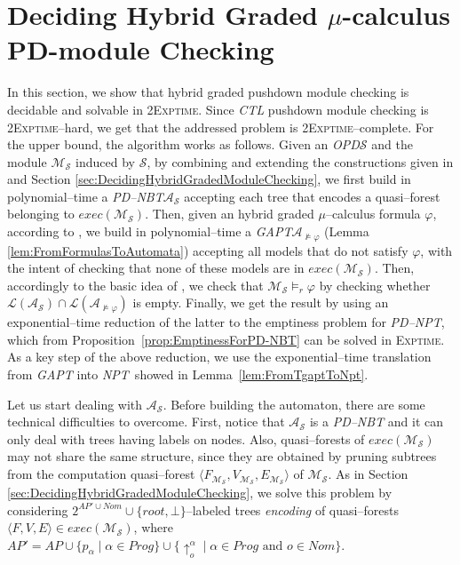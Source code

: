 \documentclass{LMCS}
\theoremstyle{plain}
\def \A             {\mathcal{A}}
\def \CTL           {\emph{CTL}\xspace}
\def \edge          {E}
\def \EXPTIME       {\textsc{Exptime}\xspace}
\def \GAPT          {\emph{GAPT}\xspace}
\def \L             {\mathcal{L}}
\def \M             {\mathcal{M}}
\def \node          {V}
\def \NPT           {\emph{NPT}\xspace}
\def \OPD           {\emph{OPD}\xspace}
\def \PDNBT         {\emph{PD--NBT}\xspace}
\def \PDNPT         {\emph{PD--NPT}\xspace}
\def \rr            {\mathit{root}}
\def \S             {\mathcal{S}}
\def \TWOEXPTIME    {\textsc{2Exptime}\xspace}
\newcommand \tpl[1] {\langle #1 \rangle}
\begin{document}
\section{Deciding Hybrid Graded $\mu$-calculus PD-module Checking}\label{sec:DecidingHybridGradedPushdownModuleChecking}
In this section, we show that hybrid graded pushdown module checking is
decidable and solvable in \TWOEXPTIME. Since \CTL pushdown module checking is
\TWOEXPTIME--hard, we get that the addressed problem is \TWOEXPTIME--complete.
For the upper bound, the algorithm works as follows. Given an \OPD $\S$ and the
module $\M_{\S}$ induced by $\S$, by combining and extending the constructions
given in \cite{BMP05} and Section \ref{sec:DecidingHybridGradedModuleChecking},
we first build in polynomial--time a \PDNBT $\A_{\S}$ accepting each tree that
encodes a quasi--forest belonging to $exec(\M_{\S})$. Then, given an hybrid
graded $\mu$--calculus formula $\varphi$, according to \cite{BLMV06}, we build
in polynomial--time a \GAPT $\A_{\not\models\varphi}$ (Lemma
\ref{lem:FromFormulasToAutomata}) accepting all models that do not satisfy
$\varphi$, with the intent of checking that none of these models are in
$exec(\M_{\S})$. Then, accordingly to the basic idea of \cite{KVW01}, we check
that $\M_{\S} \models_r \varphi$ by checking whether $\L(\A_{\S}) \cap
\L(\A_{\not\models\varphi})$ is empty. Finally, we get the result by using an
exponential--time reduction of the latter to the emptiness problem for \PDNPT,
which from Proposition~\ref{prop:EmptinessForPD-NBT} can be solved in \EXPTIME.
As a key step of the above reduction, we use the exponential--time translation
from \GAPT into \NPT\ showed in Lemma~\ref{lem:FromTgaptToNpt}.

Let us start dealing with $\A_{\S}$. Before building the
automaton, there are some technical difficulties to overcome.
First, notice that $\A_{\S}$ is a \PDNBT and it can only deal with
trees having labels on nodes. Also, quasi--forests of
$exec(\M_{\S})$ may not share the same structure, since they are
obtained by pruning subtrees from the computation quasi--forest
$\tpl{F_{\M_{\S}},\node_{\M_{\S}}, \edge_{\M_{\S}}}$ of $\M_{\S}$.
As in Section \ref{sec:DecidingHybridGradedModuleChecking}, we
solve this problem by considering  $2^{\mathit{AP}' \cup Nom}
\cup\{\rr, \bot\}$--labeled trees \emph{encoding} of
quasi--forests $\tpl{F,\node,\edge} \in exec(\M_{\S})$, where
$AP'= AP \cup \{p_{\alpha} \mid \alpha \in Prog\} \cup
\{\uparrow_o^{\alpha} \mid \alpha \in Prog \text{ and } o \in
Nom\}$.
\end{document}
